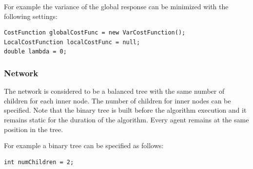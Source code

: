 \documentclass[11pt]{article} %
\begin{document}
\noindent For example the variance of the global response can be minimized with the following settings:
\begin{verbatim}
CostFunction globalCostFunc = new VarCostFunction();
LocalCostFunction localCostFunc = null;
double lambda = 0;
\end{verbatim}

\subsubsection*{Network}
The network is considered to be a balanced tree with the same number of children for each inner node. The number of children for inner nodes can be specified.
Note that the binary tree is built before the algorithm execution and it remains static for the duration of the algorithm. Every agent remains at the same position in the tree.

For example a binary tree can be specified as follows:
\begin{verbatim}
int numChildren = 2;
\end{verbatim}
\end{document}
